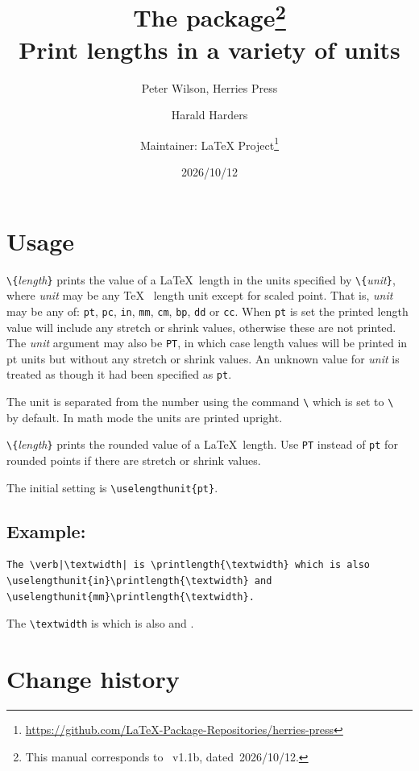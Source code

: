 \documentclass[12pt]{article}
\title{%
  The \pkg{printlen} package\thanks{This manual corresponds to \pkg{printlen.sty}~v1.1b, dated~2026/10/12.}\\
  \large
  Print lengths in a variety of units%
  }
\author{Peter Wilson, Herries Press\and Harald Harders\and Maintainer: \LaTeX{} Project\thanks{\url{https://github.com/LaTeX-Package-Repositories/herries-press}}}
\date{2026/10/12}
\makeatletter
\newcommand*{\cs}[1]{\texttt{\textbackslash#1}}
\newcommand*{\cmd}[1]{\cs{\expandafter\@gobble\string#1}}
\newcommand*{\meta}[1]{\textlangle\textsl{#1}\textrangle}
\newcommand*{\marg}[1]{\texttt{\{}\meta{#1}\texttt{\}}}
\makeatother
\begin{document}
\maketitle

\section{Usage}

\cmd{\printlength}\marg{length} prints the value of a \LaTeX\ length in the 
units specified by \cmd{\uselengthunit}\marg{unit}, where \meta{unit} may be any \TeX\ %
length unit except for scaled point. That is, \meta{unit} may be any of:
\texttt{pt}, \texttt{pc}, \texttt{in}, \texttt{mm}, \texttt{cm}, \texttt{bp}, \texttt{dd} or \texttt{cc}. When \texttt{pt} is set the printed length
value will include any stretch or shrink values, otherwise these
are not printed. The \meta{unit} argument may also be \texttt{PT}, in which case
length values will be printed in pt units but without any stretch
or shrink values. An unknown value for \meta{unit} is treated as though it
had been specified as \texttt{pt}.

The unit is separated from the number using the command
\cmd{\unitspace} which is set to \cmd{\,} by default. In math mode the units are
printed upright.

\cmd{\rndprintlength}\marg{length} prints the rounded value of a \LaTeX\ length.
Use \texttt{PT} instead of \texttt{pt} for rounded points if there are stretch or
shrink values.

The initial setting is \verb+\uselengthunit{pt}+.


\subsection*{Example:}

\begin{lstlisting}
The \verb|\textwidth| is \printlength{\textwidth} which is also
\uselengthunit{in}\printlength{\textwidth} and
\uselengthunit{mm}\printlength{\textwidth}.
\end{lstlisting}
The \verb|\textwidth| is \printlength{\textwidth} which is also
\printlength{\textwidth} and
\printlength{\textwidth}.

\section{Change history}
\end{document}
